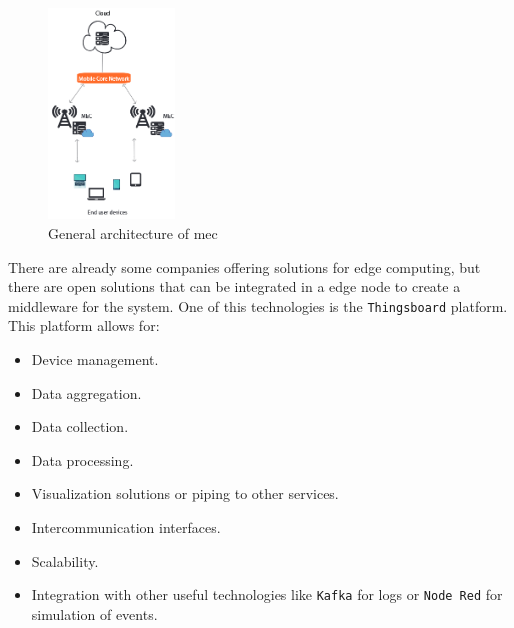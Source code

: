 \begin{figure}[H]
    \centering
    \includegraphics[width=0.3\textwidth]{./images/4/MEC.png}
    \caption{General architecture of \acrshort{mec}\cite{MobileEdgeComputing}}
    \label{fig:mec}
\end{figure}

There are already some companies offering  solutions for edge computing, but there are open solutions that can be integrated in a edge node to create a middleware for the system. One of this 
technologies is the \texttt{Thingsboard} platform. This platform allows for:
\begin{itemize}
    \item Device management.
    \item Data aggregation.
    \item Data collection.
    \item Data processing.
    \item Visualization solutions or piping to other services.
    \item Intercommunication interfaces.
    \item Scalability.
    \item Integration with other useful technologies like \texttt{Kafka} for logs or \texttt{Node Red} for simulation of events.
\end{itemize}
